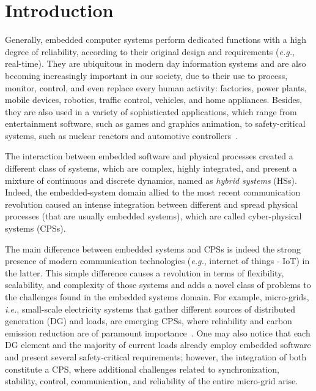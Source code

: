 \documentclass[format=acmsmall, review=false, screen=true]{acmart}
\begin{document}

\section{Introduction}

Generally, embedded computer systems perform dedicated functions with a high degree of reliability, according to their original design and requirements ({\it e.g.}, real-time). They are ubiquitous in modern day information systems and are also becoming increasingly important in our society, due to their use to process, monitor, control, and even replace every human activity: factories, power plants, mobile devices, robotics, traffic control, vehicles, and home appliances. Besides, they are also used in a variety of sophisticated applications, which range from entertainment software, such as games and graphics animation, to safety-critical systems, such as nuclear reactors and automotive controllers~\cite{Kopetz11}. 

The interaction between embedded software and physical processes created a different class of systems, which are complex, highly integrated, and present a mixture of continuous and discrete dynamics, named as \textit{hybrid systems} (HSs). Indeed, the embedded-system domain allied to the most recent communication revolution caused an intense integration between different and spread physical processes (that are usually embedded systems), which are called cyber-physical systems (CPSs). 

The main difference between embedded systems and CPSs is indeed the strong presence of modern communication technologies ({\it e.g.}, internet of things - IoT) in the latter. This simple difference causes a revolution in terms of flexibility, scalability, and complexity of those systems and adds a novel class of problems to the challenges found in the embedded systems domain. For example, micro-grids, {\it i.e.}, small-scale electricity systems that gather different sources of distributed generation (DG) and loads, are emerging CPSs, where reliability and carbon emission reduction are of paramount importance~\cite{xu15}. One may also notice that each DG element and the majority of current loads already employ embedded software and present several safety-critical requirements; however, the integration of both constitute a CPS, where additional challenges related to synchronization, stability, control, communication, and reliability of the entire micro-grid arise.
\end{document}
